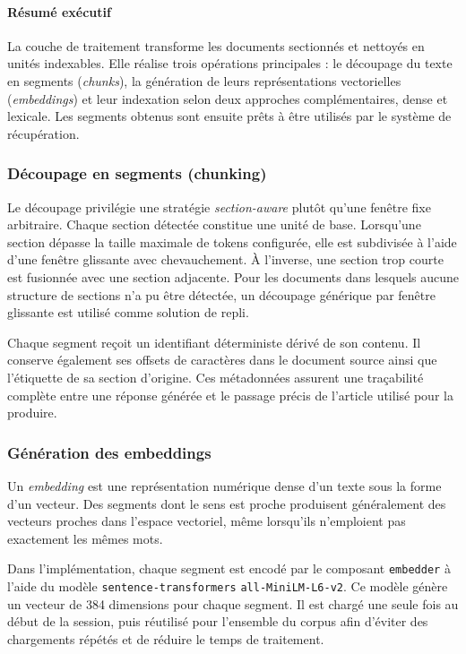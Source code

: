 \paragraph{Résumé exécutif}

La couche de traitement transforme les documents sectionnés et nettoyés en unités
indexables. Elle réalise trois opérations principales : le découpage du texte en
segments (\emph{chunks}), la génération de leurs représentations vectorielles
(\emph{embeddings}) et leur indexation selon deux approches complémentaires, dense et
lexicale. Les segments obtenus sont ensuite prêts à être utilisés par le système de
récupération.

\subsubsection{Découpage en segments (chunking)}

Le découpage privilégie une stratégie \emph{section-aware} plutôt qu'une fenêtre fixe
arbitraire. Chaque section détectée constitue une unité de base. Lorsqu'une section
dépasse la taille maximale de tokens configurée, elle est subdivisée à l'aide d'une
fenêtre glissante avec chevauchement. À l'inverse, une section trop courte est
fusionnée avec une section adjacente. Pour les documents dans lesquels aucune
structure de sections n'a pu être détectée, un découpage générique par fenêtre
glissante est utilisé comme solution de repli.

Chaque segment reçoit un identifiant déterministe dérivé de son contenu. Il conserve
également ses offsets de caractères dans le document source ainsi que l'étiquette de
sa section d'origine. Ces métadonnées assurent une traçabilité complète entre une
réponse générée et le passage précis de l'article utilisé pour la produire.

\subsubsection{Génération des embeddings}

Un \emph{embedding} est une représentation numérique dense d'un texte sous la forme
d'un vecteur. Des segments dont le sens est proche produisent généralement des
vecteurs proches dans l'espace vectoriel, même lorsqu'ils n'emploient pas exactement
les mêmes mots.

Dans l'implémentation, chaque segment est encodé par le composant
\texttt{embedder} à l'aide du modèle \texttt{sentence-transformers}
\texttt{all-MiniLM-L6-v2}. Ce modèle génère un vecteur de 384 dimensions pour chaque
segment. Il est chargé une seule fois au début de la session, puis réutilisé pour
l'ensemble du corpus afin d'éviter des chargements répétés et de réduire le temps de
traitement.


